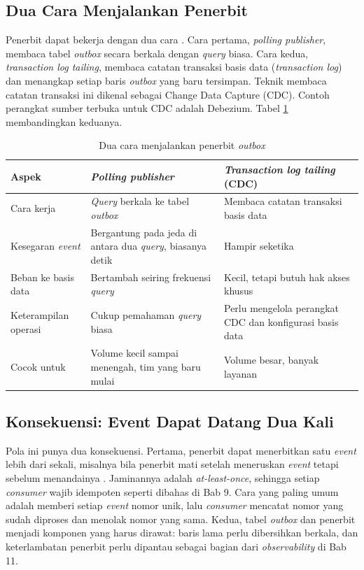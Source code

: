 \subsection{Dua Cara Menjalankan Penerbit}

Penerbit dapat bekerja dengan dua cara \cite{c10-richardson-outbox}. Cara pertama, \textit{polling
publisher}, membaca tabel \textit{outbox} secara berkala dengan \textit{query} biasa. Cara kedua,
\textit{transaction log tailing}, membaca catatan transaksi basis data (\textit{transaction log})
dan menangkap setiap baris \textit{outbox} yang baru tersimpan. Teknik membaca catatan transaksi ini
dikenal sebagai Change Data Capture (CDC). Contoh perangkat sumber terbuka untuk CDC adalah
Debezium. Tabel \ref{tab:ch10-penerbit} membandingkan keduanya.

\begin{table}[!htb]
  \centering
  \caption{Dua cara menjalankan penerbit \textit{outbox}}
  \label{tab:ch10-penerbit}
  \footnotesize
  \begin{tabularx}{\textwidth}{>{\raggedright\arraybackslash}p{2.4cm} >{\raggedright\arraybackslash}X >{\raggedright\arraybackslash}X}
    \hline
    \textbf{Aspek} & \textbf{\textit{Polling publisher}} & \textbf{\textit{Transaction log
      tailing} (CDC)} \\ \hline
    Cara kerja & \textit{Query} berkala ke tabel \textit{outbox} & Membaca catatan transaksi basis
      data \\ \hline
    Kesegaran \textit{event} & Bergantung pada jeda di antara dua \textit{query}, biasanya detik &
      Hampir seketika \\ \hline
    Beban ke basis data & Bertambah seiring frekuensi \textit{query} & Kecil, tetapi butuh hak
      akses khusus \\ \hline
    Keterampilan operasi & Cukup pemahaman \textit{query} biasa & Perlu mengelola perangkat CDC
      dan konfigurasi basis data \\ \hline
    Cocok untuk & Volume kecil sampai menengah, tim yang baru mulai & Volume besar, banyak layanan
      \\ \hline
  \end{tabularx}
\end{table}

\subsection{Konsekuensi: Event Dapat Datang Dua Kali}

Pola ini punya dua konsekuensi. Pertama, penerbit dapat menerbitkan satu \textit{event} lebih dari
sekali, misalnya bila penerbit mati setelah meneruskan \textit{event} tetapi sebelum menandainya
\cite{c10-richardson-outbox}. Jaminannya adalah \textit{at-least-once}, sehingga setiap
\textit{consumer} wajib idempoten seperti dibahas di Bab 9. Cara yang paling umum adalah memberi
setiap \textit{event} nomor unik, lalu \textit{consumer} mencatat nomor yang sudah diproses dan
menolak nomor yang sama. Kedua, tabel \textit{outbox} dan penerbit menjadi komponen yang harus
dirawat: baris lama perlu dibersihkan berkala, dan keterlambatan penerbit perlu dipantau sebagai
bagian dari \textit{observability} di Bab 11.


